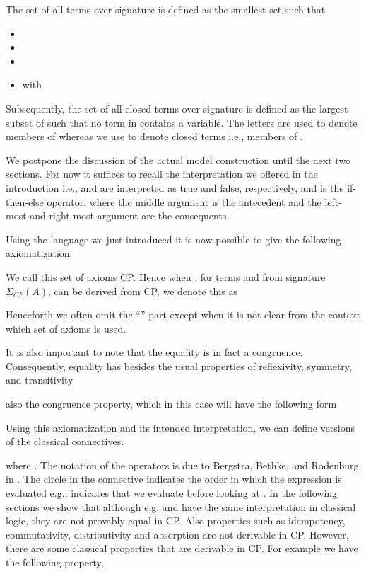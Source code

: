 \documentclass[a4paper,twoside,openright]{report}
\newcommand{\sig}{\ensuremath{\Sigma_{CP}(A)}}
\begin{document}
The set  of all terms over signature  is defined as the smallest set such that
\begin{itemize}
\item 
\item 
\item 
\item  with 
\end{itemize}
Subsequently, the set  of all closed terms over signature  is defined as the largest subset of  such that no term in  contains a variable. The letters  are used to denote members of  whereas we use  to denote closed terms i.e., members of .

We postpone the discussion of the actual model construction until the next two sections. For now it suffices to recall the interpretation we offered in the introduction i.e.,  and  are interpreted as true and false, respectively, and  is the if-then-else operator, where the middle argument is the antecedent and the left-most and right-most argument are the consequents.





Using the language we just introduced it is now possible to give the following axiomatization:

We call this set of axioms CP. Hence when , for terms  and  from signature \sig, can be derived from CP, we denote this as

Henceforth we often omit the ``'' part except when it is not clear from the context which set of axioms is used.

It is also important to note that the equality is in fact a congruence. Consequently, equality has besides the usual properties of reflexivity, symmetry, and transitivity

also the congruence property, which in this case will have the following form


Using this axiomatization and its intended interpretation, we can define versions of the classical connectives.

where . The notation of the operators is due to Bergstra, Bethke, and Rodenburg in \cite{connectives}. The circle in the connective indicates the order in which the expression is evaluated e.g.,  indicates that we evaluate  before looking at . In the following sections we show that although e.g.  and  have the same interpretation in classical logic, they are not provably equal in CP. Also properties such as idempotency, commutativity, distributivity and absorption are not derivable in CP. However, there are some classical properties that are derivable in CP. For example we have the following property,
\end{document}
